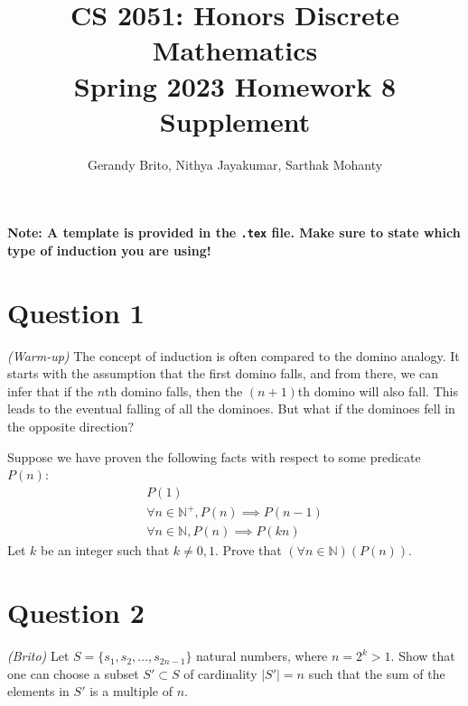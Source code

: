 \documentclass{article}
\title{\vspace{-1cm}CS 2051: Honors Discrete Mathematics \\Spring 2023 Homework 8 Supplement}
\author{Gerandy Brito, Nithya Jayakumar, Sarthak Mohanty}
\date{}
\begin{document}
\maketitle

\textbf{Note: A template is provided in the \texttt{.tex} file. Make sure to state which type of induction you are using!}

\section*{Question 1}
    \textit{(Warm-up)} The concept of induction is often compared to the domino analogy. It starts with the assumption that the first domino falls, and from there, we can infer that if the $n$th domino falls, then the $(n + 1)$th domino will also fall. This leads to the eventual falling of all the dominoes. But what if the dominoes fell in the opposite direction? 
    
    \vspace{2mm}
    Suppose we have proven the following facts with respect to some predicate $P(n)$:
    \begin{gather}
        P(1) \\
        \forall n \in \mathbb{N}^{+}, P(n) \implies P(n - 1) \\
        \forall n \in \mathbb{N}, P(n) \implies P(kn)
    \end{gather}
    Let $k$ be an integer such that $k \ne 0, 1$. Prove that $(\forall n \in \mathbb{N})(P(n))$.

\section*{Question 2 }
    \textit{(Brito)} Let $S=\{s_1,s_2,\ldots, s_{2n-1}\}$ natural numbers, where $n=2^k>1$. Show that one can choose a subset $S'\subset S$ of cardinality $|S'|=n$ such that the sum of the elements in $S'$ is a multiple of $n$.




\end{document}
